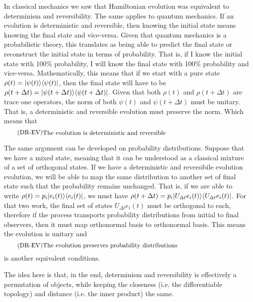 In classical mechanics we saw that Hamiltonian evolution was equivalent to determinism and reversibility. The same applies to quantum mechanics. If an evolution is deterministic and reversible, then knowing the initial state means knowing the final state and vice-versa. Given that quantum mechanics is a probabilistic theory, this translates as being able to predict the final state or reconstruct the initial state in terms of probability. That is, if I know the initial state with 100\% probability, I will know the final state with 100\% probability and vice-versa. Mathematically, this means that if we start with a pure state $\rho(t) = |\psi(t) \rangle \langle \psi(t)|$, then the final state will have to be $\rho(t+\Delta t) = |\psi(t+\Delta t) \rangle \langle \psi(t+\Delta t)|$. Given that both $\rho(t)$ and $\rho(t + \Delta t)$ are trace one operators, the norm of both $\psi(t)$ and $\psi(t+\Delta t)$ must be unitary. That is, a deterministic and reversible evolution must preserve the norm. Which means that 
\begin{equation}\label{rp-qm-uev-condDetRev}
	\tag{DR-EV}
	\eqtext{The evolution is deterministic and reversible} 
\end{equation}

The same argument can be developed on probability distributions. Suppose that we have a mixed state, meaning that it can be understood as a classical mixture of a set of orthogonal states. If we have a deterministic and reversibile evolution evolution, we will be able to map the same distribution to another set of final state such that the probability remains unchanged. That is, if we are able to write $\rho(t) = p_i |e_i(t) \rangle \langle e_i(t)|$, we must have $\rho(t+ \Delta t) = p_i |U_{\Delta t}e_i(t) \rangle \langle U_{\Delta t} e_i(t)|$. For that two work, the final set of states $U_{\Delta t}e_i(t)$ must be orthogonal to each, therefore if the process transports probability distributions from initial to final observers, then it must map orthonormal basis to orthonormal basis. This means the evolution is unitary and 
\begin{equation}\label{rp-qm-uev-condProbTrans}
	\tag{DR-EV}
	\eqtext{The evolution preserves probability distributions} 
\end{equation}
is another equivalent conditions.

The idea here is that, in the end, determinism and reversibility is effectively a permutation of objects, while keeping the closeness (i.e. the differentiable topology) and distance (i.e. the inner product) the same.


